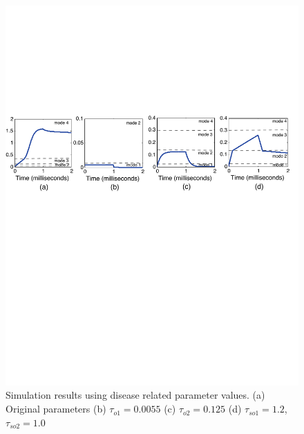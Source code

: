 \begin{figure}[h]
\centering
\includegraphics[scale=0.6]{fig-cardiactraj2}
\caption{Simulation results using disease related parameter values. (a) Original parameters (b) $\tau_{o1}=0.0055$ (c) $\tau_{o2} = 0.125$ (d) $\tau_{so1} =1.2$, $\tau_{so2} =1.0$ }
\label{cresults}
\end{figure}

